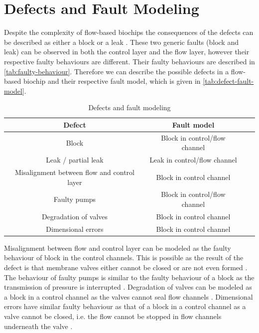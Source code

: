 \section{Defects and Fault Modeling}
Despite the complexity of flow-based biochips the consequences of the defects can be described as either a block or a leak \cite{fault-modeling}. These two generic faults (block and leak) can be observed in both the control layer and the flow layer, however their respective faulty behaviours are different. Their faulty behaviours are described in \autoref{tab:faulty-behaviour}. Therefore we can describe the possible defects in a flow-based biochip and their respective fault model, which is given in \autoref{tab:defect-fault-model}.

\begin{table}[H]
\centering
\caption{Defects and fault modeling}
\begin{tabular}{| c | c | c | c |}
\hline
\textbf{Defect} & \textbf{Fault model}\\ \hline
Block & Block in control/flow channel\\ \hline
Leak / partial leak & Leak in control/flow channel\\ \hline
Misalignment between flow and control layer & Block in control channel\\ \hline
Faulty pumps & Block in control/flow channel\\ \hline
Degradation of valves & Block in control channel\\ \hline
Dimensional errors & Block in control channel\\ \hline
\end{tabular}
\label{tab:defect-fault-model}
\end{table}

Misalignment between flow and control layer can be modeled as the faulty behaviour of block in the control channels. This is possible as the result of the defect is that membrane valves either cannot be closed or are not even formed \cite{fault-modeling}.
The behaviour of faulty pumps is similar to the faulty behaviour of a block as the transmission of pressure is interrupted \cite{fault-modeling}.
Degradation of valves can be modeled as a block in a control channel as the valves cannot seal flow channels \cite{fault-modeling}.
Dimensional errors have similar faulty behaviour as that of a block in a control channel as a valve cannot be closed, i.e. the flow cannot be stopped in flow channels underneath the valve \cite{fault-modeling}.\\

